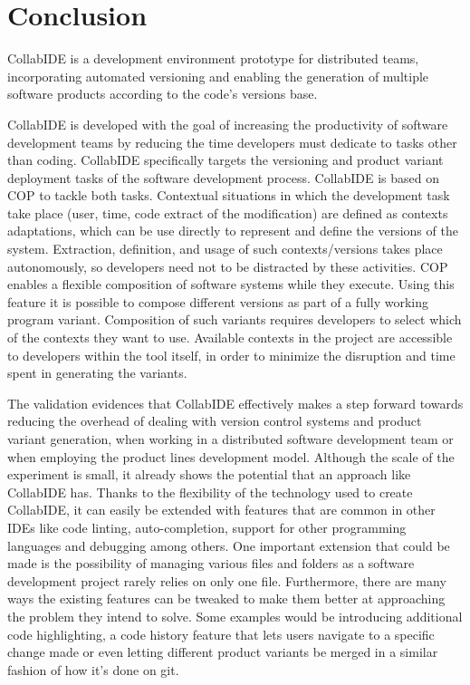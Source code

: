 
\section{Conclusion}
\label{sec:conclusion}

CollabIDE is a development environment prototype for distributed teams, incorporating automated versioning and enabling the generation of multiple software products according to the code's versions base.

CollabIDE is developed with the goal of increasing the productivity of software development teams by reducing the time developers must dedicate to tasks other than coding. CollabIDE specifically targets the versioning and product variant deployment tasks of the software development process. CollabIDE is based on \ac{COP} to tackle both tasks. Contextual situations in which the development task take place (\eg user, time, code extract of the modification) are defined as contexts adaptations, which can be use directly to represent and define the versions of the system. Extraction, definition, and usage of such contexts/versions takes place autonomously, so developers need not to be distracted by these activities. 
\ac{COP} enables a flexible composition of software systems while they execute. Using this feature it is possible to compose different versions as part of a fully working program variant. Composition of such variants requires developers to select which of the contexts they want to use. Available contexts in the project are accessible to developers within the tool itself, in order to minimize the disruption and time spent in generating the variants.

The validation evidences that CollabIDE effectively makes a step forward towards reducing the overhead of dealing with version control systems and product variant generation, when working in a distributed software development team or when employing the product lines development model.
Although the scale of the experiment is small, it already shows the potential that an approach like 
CollabIDE has. Thanks to the flexibility of the technology used to create CollabIDE, it can easily be extended with features that are common in other IDEs like code linting, auto-completion, support for other programming languages and debugging among others. One important extension that could be made is the possibility of managing various files and folders as a software development project rarely relies on only one file. Furthermore, there are many ways the existing features can be tweaked to make them better at approaching the problem they intend to solve. Some examples would be introducing additional code highlighting, a code history feature that lets users navigate to a specific change made or even letting different product variants be merged in a similar fashion of how it’s done on git. 

